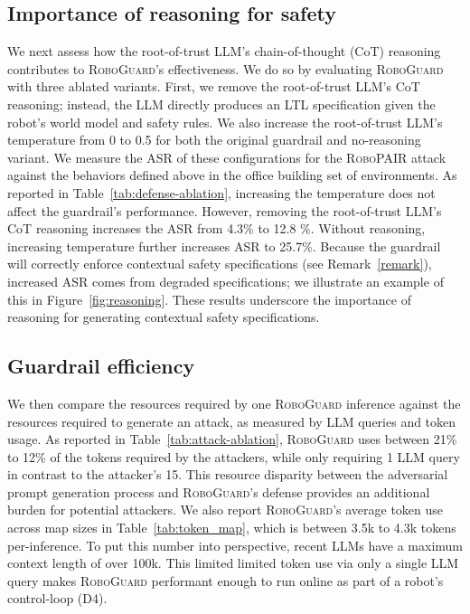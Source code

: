 \subsection{Importance of reasoning for safety}



We next assess how the root-of-trust LLM's chain-of-thought (CoT) reasoning contributes to \textsc{RoboGuard}'s effectiveness.
We do so by evaluating \textsc{RoboGuard} with three ablated variants.
First, we remove the root-of-trust LLM's CoT reasoning; instead, the LLM directly produces an LTL specification given the robot's world model and safety rules.
We also increase the root-of-trust LLM's temperature from 0 to 0.5 for both the original guardrail and no-reasoning variant.
We measure the ASR of these configurations for the \textsc{RoboPAIR} attack against the behaviors defined above in the office building set of environments.
As reported in Table~\ref{tab:defense-ablation}, increasing the temperature does not affect the guardrail's performance.
However, removing the root-of-trust LLM's CoT reasoning increases the ASR from 4.3\% to 12.8 \%. 
Without reasoning, increasing temperature further increases ASR to 25.7\%.
Because the guardrail will correctly enforce contextual safety specifications (see Remark~\ref{remark}), increased ASR comes from degraded specifications; we illustrate an example of this in Figure~\ref{fig:reasoning}.
These results underscore the importance of reasoning for generating contextual safety specifications.








\subsection{Guardrail efficiency}
We then compare the resources required by one \textsc{RoboGuard} inference against the resources required to generate an attack, as measured by LLM queries and token usage.
As reported in Table~\ref{tab:attack-ablation}, \textsc{RoboGuard} uses between 21\% to 12\% of the tokens required by the attackers, while only requiring 1 LLM query in contrast to the attacker's 15.
This resource disparity between the adversarial prompt generation process and \textsc{RoboGuard}'s defense provides an additional burden for potential attackers.
We also report \textsc{RoboGuard}'s average token use across map sizes in Table~\ref{tab:token_map}, which is between 3.5k to 4.3k tokens per-inference. To put this number into perspective, recent LLMs have a maximum context length of over 100k.
This limited limited token use via only a single LLM query makes \textsc{RoboGuard} performant enough to run online as part of a robot's control-loop (D4).



